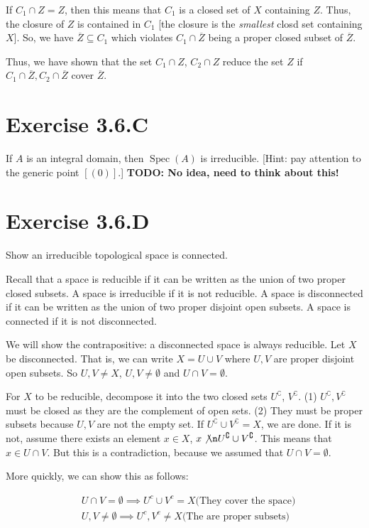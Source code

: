 \documentclass{book}
\newcommand{\Spec}{\operatorname{Spec}}
\newcommand{\c}{\complement} %
\theoremstyle{definition}
\begin{document}
If $C_1 \cap Z = Z$, then this means that $C_1$ is a closed set of $X$ containing 
$Z$. Thus, the closure of $Z$ is contained in $C_1$ [the closure is the 
\emph{smallest} closd set containing $X$]. So, we have $\overline{Z} \subseteq C_1$
which violates $C_1 \cap \overline{Z}$ being a proper closed subset of $\overline{Z}$.

Thus, we have shown that the set $C_1 \cap Z$, $C_2 \cap Z$ reduce the set
$Z$ if $C_1 \cap \overline Z, C_2 \cap \overline Z$ cover $\overline Z$. 

\section{Exercise 3.6.C}
If $A$ is an integral domain, then $\Spec(A)$ is irreducible. [Hint:
pay attention to the generic point $[(0)]$.]
\textbf{TODO: No idea, need to think about this!}


\section{Exercise 3.6.D}
Show an irreducible topological space is connected.

Recall that a space is reducible if it can be written as the union of
two proper closed subsets. A space is irreducible if it is not
reducible. A space is disconnected if it can be written as the union
of two proper disjoint open subsets. A space is connected if it is
not disconnected.

We will show the contrapositive: a disconnected space is always
reducible. Let $X$ be disconnected. That is, we can write $X = U \cup V$
where $U, V$ are proper disjoint open subsets. So
$U, V \neq X$, $U, V \neq \emptyset$ and $U \cap V = \emptyset$. 

For $X$ to be reducible, decompose it into the two closed sets $U^\c$,
$V^\c$.  (1) $U^\c, V^\c$ must be closed as they are the
complement of open sets. (2) They must be proper subsets because $U, V$ 
are not the empty set. If $U^\c \cup V^\c = X$, we are done.
If it is not, assume there exists an element $x \in X$, $x \not \n U^\c \cup V^\c$.
This means that $x \in U \cap V$. But this is a contradiction, because we assumed
that $U \cap V = \emptyset$.


More quickly, we can show this as follows:

\begin{align*}
&U \cap V = \emptyset \implies U^c \cup V^c = X \text{(They cover the space)} \\
&U, V \neq \emptyset \implies U^c, V^c \neq X \text{(The are proper subsets)}
\end{align*}
\end{document}
